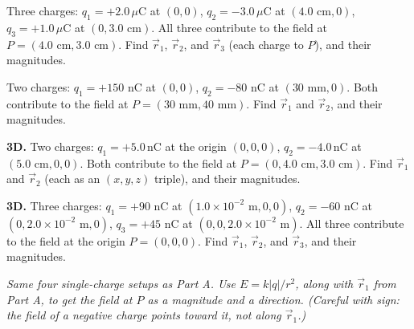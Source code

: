 \documentclass[12pt]{article}
\begin{document}
\prob Three charges: $q_1=+2.0\,\mu\text{C}$ at $(0,0)$, $q_2=-3.0\,\mu\text{C}$ at $(4.0\text{ cm},0)$, $q_3=+1.0\,\mu\text{C}$ at $(0,3.0\text{ cm})$. All three contribute to the field at $P=(4.0\text{ cm},3.0\text{ cm})$. Find $\vec{r}_1$, $\vec{r}_2$, and $\vec{r}_3$ (each charge to $P$), and their magnitudes.

\begin{center}
\end{center}


\prob Two charges: $q_1=+150$ nC at $(0,0)$, $q_2=-80$ nC at $(30\text{ mm},0)$. Both contribute to the field at $P=(30\text{ mm},40\text{ mm})$. Find $\vec{r}_1$ and $\vec{r}_2$, and their magnitudes.


\prob \textbf{3D.} Two charges: $q_1=+5.0\,\text{nC}$ at the origin $(0,0,0)$, $q_2=-4.0\,\text{nC}$ at $(5.0\text{ cm},0,0)$. Both contribute to the field at $P=(0,4.0\text{ cm},3.0\text{ cm})$. Find $\vec{r}_1$ and $\vec{r}_2$ (each as an $(x,y,z)$ triple), and their magnitudes.


\prob \textbf{3D.} Three charges: $q_1=+90$ nC at $(1.0\times10^{-2}\text{ m},0,0)$, $q_2=-60$ nC at $(0,2.0\times10^{-2}\text{ m},0)$, $q_3=+45$ nC at $(0,0,2.0\times10^{-2}\text{ m})$. All three contribute to the field at the origin $P=(0,0,0)$. Find $\vec{r}_1$, $\vec{r}_2$, and $\vec{r}_3$, and their magnitudes.


\clearpage

\textit{Same four single-charge setups as Part A. Use $E=k|q|/r^2$, along with $\vec{r}_1$ from Part A, to get the field at $P$ as a magnitude and a direction. (Careful with sign: the field of a negative charge points \emph{toward} it, not along $\vec{r}_1$.)}
\end{document}
